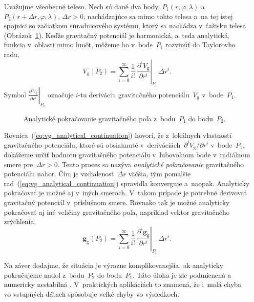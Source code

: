 \documentclass[a4paper,12pt]{book}
\newcommand{\gidx}{\mathrm g}
\let\vec\mathbf
\begin{document}
Uvažujme všeobecné teleso.  Nech sú dané dva body,
$P_1(r, \varphi, \lambda)$ a~$P_2(r + \Delta r, \varphi, \lambda)$, $\Delta
r > 0$, nachádzajúce sa mimo tohto telesa a~na tej istej spojnici so začiatkom
súradnicového systému, ktorý sa nachádza v~ťažisku telesa
(Obrázok~\ref{fig:analytical_continuation}).  Keďže gravitačný potenciál je 
harmonická, a~teda analytická, funkcia v~oblasti mimo hmôt, môžeme ho 
v~bode~$P_1$ rozvinúť do Taylorovho radu,
%
\begin{equation}
\label{eq:vg_analytical_continuation}
V_\gidx(P_2) = \sum_{i = 0}^\infty \frac{1}{i!} \, \left.\frac{\partial^i
V_\gidx}{\partial r^i}\right|_{P_1} \, \Delta r^i{.}
\end{equation}
%
Symbol $\left.\frac{\partial^i V_\gidx}{\partial r^i} \right|_{P_1}$ označuje 
$i$-tu deriváciu gravitačného potenciálu~$V_\gidx$ v~bode~$P_1$.

\begin{figure}

\centering

\caption{Analytické pokračovanie gravitačného poľa z~bodu~$P_1$ do bodu~$P_2$.}
\label{fig:analytical_continuation}
\end{figure}

Rovnica~(\ref{eq:vg_analytical_continuation}) hovorí, že z~lokálnych vlastností 
gravitačného potenciálu, ktoré sú obsiahnuté v~deriváciách~$\partial^i V_\gidx 
\slash \partial r^i$ v~bode~$P_1$, dokážeme určiť hodnotu gravitačného 
potenciálu v~ľubovoľnom bode v~radiálnom smere pre~$\Delta r > 0$.  Tento 
proces sa nazýva \emph{analytické pokračovanie} gravitačného potenciálu nahor.  
Čím je vzdialenosť~$\Delta r$ väčšia, tým pomalšie 
rad~(\ref{eq:vg_analytical_continuation}) spravidla konverguje a~naopak.  
Analyticky pokračovať je možné aj v~iných smeroch.  V~takom prípade je potrebné 
derivovať gravitačný potenciál v~príslušnom smere.  Rovnako tak je možné 
analyticky pokračovať aj iné veličiny gravitačného poľa, napríklad vektor 
gravitačného zrýchlenia,
%
\begin{equation}
\label{eq:gg_analytical_continuation}
\vec g_\gidx(P_2) = \sum_{i = 0}^{\infty} \frac{1}{i!} \, 
\left.\frac{\partial^i \vec
g_\gidx}{\partial r^i}\right|_{P_1} \, \Delta r^i{.}
\end{equation}

Na záver dodajme, že situácia je výrazne komplikovanejšia, ak analyticky 
pokračujeme nadol z~bodu~$P_2$ do bodu~$P_1$.  Táto úloha je zle podmienená 
a numericky nestabilná \parencite{SansoGeodeticBoundaryValueProblem}.  
V~praktických aplikáciách to znamená, že i~malá chyba vo vstupných dátach 
spôsobuje veľké chyby vo výsledkoch.
\end{document}
